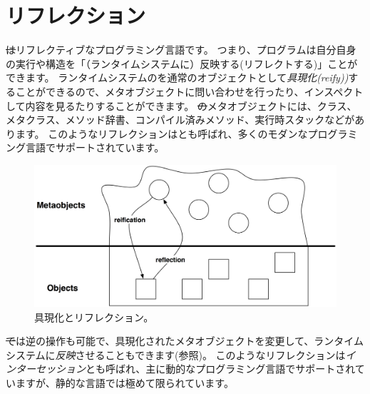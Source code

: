 \documentclass[a4paper,10pt,twoside]{book}
\begin{document}
	\renewcommand{\nnbb}[2]{} %
	\sloppy
\fi

\chapter{リフレクション}


\st はリフレクティブなプログラミング言語です。
つまり、プログラムは自分自身の実行や構造を「（ランタイムシステムに）反映する(リフレクトする)」ことができます。
ランタイムシステムのを通常のオブジェクトとして\emph{具現化(reify))}することができるので、メタオブジェクトに問い合わせを行ったり、インスペクトして内容を見るたりすることができます。
\st のメタオブジェクトには、クラス、メタクラス、メソッド辞書、コンパイル済みメソッド、実行時スタックなどがあります。
このようなリフレクションはとも呼ばれ、多くのモダンなプログラミング言語でサポートされています。

\begin{figure}[ht]\centering
	\includegraphics[width=\linewidth]{reflect}
	\caption{具現化とリフレクション。} %
\end{figure}

\st では逆の操作も可能で、具現化されたメタオブジェクトを変更して、ランタイムシステムに\emph{反映}させることもできます(参照)。
このようなリフレクションは\emph{インターセッション}とも呼ばれ、主に動的なプログラミング言語でサポートされていますが、静的な言語では極めて限られています。
\end{document}
